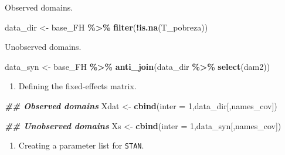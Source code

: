 \documentclass[
  12pt,
]{book}
\newenvironment{Shaded}{\begin{snugshade}}{\end{snugshade}}
\newcommand{\AttributeTok}[1]{\textcolor[rgb]{0.13,0.29,0.53}{#1}}
\newcommand{\DecValTok}[1]{\textcolor[rgb]{0.00,0.00,0.81}{#1}}
\newcommand{\DocumentationTok}[1]{\textcolor[rgb]{0.56,0.35,0.01}{\textbf{\textit{#1}}}}
\newcommand{\FunctionTok}[1]{\textcolor[rgb]{0.13,0.29,0.53}{\textbf{#1}}}
\newcommand{\NormalTok}[1]{#1}
\newcommand{\OtherTok}[1]{\textcolor[rgb]{0.56,0.35,0.01}{#1}}
\newcommand{\SpecialCharTok}[1]{\textcolor[rgb]{0.81,0.36,0.00}{\textbf{#1}}}
\providecommand{\tightlist}{%
  \setlength{\itemsep}{0pt}\setlength{\parskip}{0pt}}
\begin{document}
Observed domains.

\begin{Shaded}
\begin{Highlighting}[]
\NormalTok{data\_dir }\OtherTok{\textless{}{-}}\NormalTok{ base\_FH }\SpecialCharTok{\%\textgreater{}\%} \FunctionTok{filter}\NormalTok{(}\SpecialCharTok{!}\FunctionTok{is.na}\NormalTok{(T\_pobreza))}
\end{Highlighting}
\end{Shaded}

Unobserved domains.

\begin{Shaded}
\begin{Highlighting}[]
\NormalTok{data\_syn }\OtherTok{\textless{}{-}}
\NormalTok{  base\_FH }\SpecialCharTok{\%\textgreater{}\%} \FunctionTok{anti\_join}\NormalTok{(data\_dir }\SpecialCharTok{\%\textgreater{}\%} \FunctionTok{select}\NormalTok{(dam2))}
\end{Highlighting}
\end{Shaded}

\begin{enumerate}
\def\labelenumi{\arabic{enumi}.}
\setcounter{enumi}{1}
\tightlist
\item
  Defining the fixed-effects matrix.
\end{enumerate}

\begin{Shaded}
\begin{Highlighting}[]
\DocumentationTok{\#\# Observed domains}
\NormalTok{Xdat }\OtherTok{\textless{}{-}} \FunctionTok{cbind}\NormalTok{(}\AttributeTok{inter =} \DecValTok{1}\NormalTok{,data\_dir[,names\_cov])}

\DocumentationTok{\#\# Unobserved domains}
\NormalTok{Xs }\OtherTok{\textless{}{-}}  \FunctionTok{cbind}\NormalTok{(}\AttributeTok{inter =} \DecValTok{1}\NormalTok{,data\_syn[,names\_cov])}
\end{Highlighting}
\end{Shaded}

\begin{enumerate}
\def\labelenumi{\arabic{enumi}.}
\setcounter{enumi}{2}
\tightlist
\item
  Creating a parameter list for \texttt{STAN}.
\end{enumerate}
\end{document}
